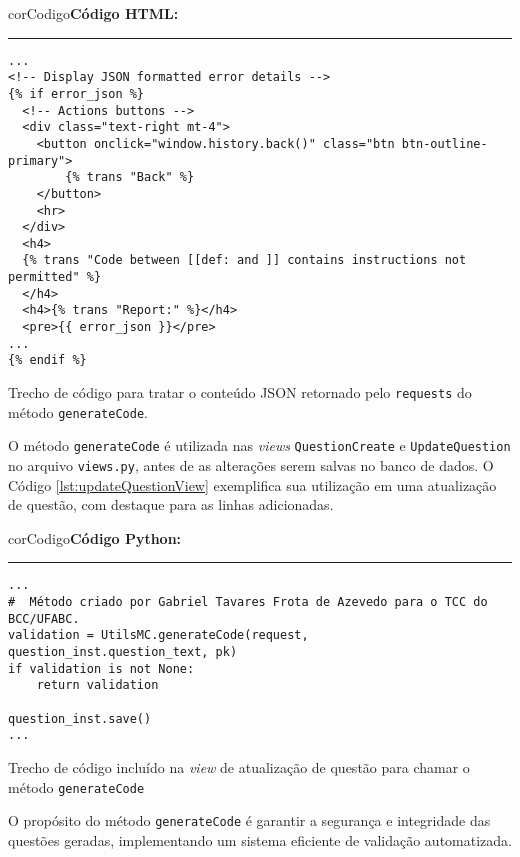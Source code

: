 \begin{listing}[!ht]
    \begin{myboxCode}{corCodigo}{\textbf{Código HTML: }}\vspace{3mm}
    \hrule
    \begin{verbatim}
...
<!-- Display JSON formatted error details -->
{% if error_json %}
  <!-- Actions buttons -->
  <div class="text-right mt-4">
    <button onclick="window.history.back()" class="btn btn-outline-primary">
        {% trans "Back" %}
    </button>
    <hr>
  </div>
  <h4>
  {% trans "Code between [[def: and ]] contains instructions not permitted" %}
  </h4>
  <h4>{% trans "Report:" %}</h4>
  <pre>{{ error_json }}</pre>
...
{% endif %}
\end{verbatim}
\end{myboxCode}
\caption{Trecho de código para tratar o conteúdo JSON retornado pelo \texttt{requests} do método \texttt{generateCode}.}
\label{lst:erroHTML}
\end{listing}


O método \texttt{generateCode} é utilizada nas \textit{views} \texttt{QuestionCreate} e \texttt{UpdateQuestion} no arquivo \texttt{views.py}, antes de as alterações serem salvas no banco de dados. O Código \ref{lst:updateQuestionView} exemplifica sua utilização em uma atualização de questão, com destaque para as linhas adicionadas.

\begin{listing}[!ht]
    \begin{myboxCode}{corCodigo}{\textbf{Código Python: }}\vspace{3mm}
    \hrule
    \begin{verbatim}
...
#  Método criado por Gabriel Tavares Frota de Azevedo para o TCC do BCC/UFABC.
validation = UtilsMC.generateCode(request, question_inst.question_text, pk)
if validation is not None:
    return validation

question_inst.save()
...
\end{verbatim}
\end{myboxCode}
\caption{Trecho de código incluído na \textit{view} de atualização de questão para chamar o método \texttt{generateCode}}
\label{lst:updateQuestionView}
\end{listing}


O propósito do método \texttt{generateCode} é garantir a segurança e integridade das questões geradas, implementando um sistema eficiente de validação automatizada.

